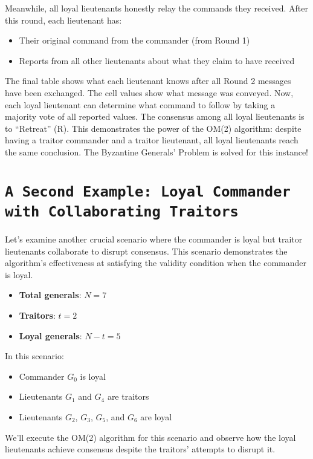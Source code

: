 \documentclass[11pt]{article}
\newcommand{\gen}[1]{\ensuremath{G_{#1}}}
\begin{document}
Meanwhile, all loyal lieutenants honestly relay the commands they received. After this round, each lieutenant has:
\begin{itemize}
    \item Their original command from the commander (from Round 1)
    \item Reports from all other lieutenants about what they claim to have received
\end{itemize}

The final table shows what each lieutenant knows after all Round 2 messages have been exchanged. The cell values show what message was conveyed.
Now, each loyal lieutenant can determine what command to follow by taking a majority vote of all reported values. The consensus among all loyal lieutenants is to ``Retreat'' (R).
This demonstrates the power of the OM(2) algorithm: despite having a traitor commander and a traitor lieutenant, all loyal lieutenants reach the same conclusion. The Byzantine Generals' Problem is solved for this instance!

\section*{\texttt{\Large A Second Example: Loyal Commander with Collaborating Traitors}}

\justifying
Let's examine another crucial scenario where the commander is loyal but traitor lieutenants collaborate to disrupt consensus. This scenario demonstrates the algorithm's effectiveness at satisfying the validity condition when the commander is loyal.

\begin{itemize}
    \item \textbf{Total generals}: $N = 7$
    \item \textbf{Traitors}: $t = 2$
    \item \textbf{Loyal generals}: $N - t = 5$
\end{itemize}

In this scenario:
\begin{itemize}
    \item Commander $\gen{0}$ is loyal
    \item Lieutenants $\gen{1}$ and $\gen{4}$ are traitors
    \item Lieutenants $\gen{2}$, $\gen{3}$, $\gen{5}$, and $\gen{6}$ are loyal
\end{itemize}

We'll execute the OM(2) algorithm for this scenario and observe how the loyal lieutenants achieve consensus despite the traitors' attempts to disrupt it.
\end{document}
